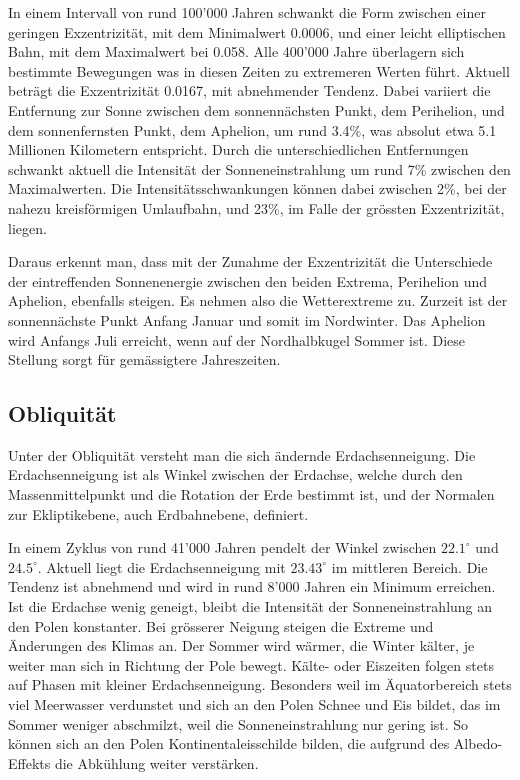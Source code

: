 In einem Intervall von rund 100'000 Jahren schwankt die Form zwischen einer geringen Exzentrizität, mit dem Minimalwert 0.0006, und einer leicht elliptischen Bahn, mit dem Maximalwert bei 0.058.
Alle 400'000 Jahre überlagern sich bestimmte Bewegungen was in diesen Zeiten zu extremeren Werten führt.
Aktuell beträgt die Exzentrizität 0.0167, mit abnehmender Tendenz.
Dabei variiert die Entfernung zur Sonne zwischen dem sonnennächsten Punkt, dem Perihelion, und dem son\-nen\-fern\-sten Punkt, dem Aphelion, um rund 3.4\%, was absolut etwa 5.1 Millionen Kilometern entspricht.
Durch die unterschiedlichen Entfernungen schwankt aktuell die Intensität der Sonneneinstrahlung um rund 7\% zwischen den Maximalwerten.
Die Intensitätsschwankungen können dabei zwischen 2\%, bei der nahezu kreisförmigen Umlaufbahn, und 23\%, im Falle der grössten Exzentrizität, liegen.

Daraus erkennt man, dass mit der Zunahme der Exzentrizität die Unterschiede der eintreffenden Sonnenenergie zwischen den beiden Extrema, Perihelion und Aphelion, ebenfalls steigen.
Es nehmen also die Wetterextreme zu.
Zurzeit ist der sonnennächste Punkt Anfang Januar und somit im Nordwinter. Das Aphelion wird Anfangs Juli erreicht, wenn auf der Nordhalbkugel Sommer ist.
Diese Stellung sorgt für gemässigtere Jahreszeiten. 

\subsection{Obliquität
\label{milankovic:subsection:Obliquität}}
Unter der Obliquität versteht man die sich ändernde Erdachsenneigung.
Die Erdachsenneigung ist als Winkel zwischen der Erdachse, welche durch den Massenmittelpunkt und die Rotation der Erde bestimmt ist, und der Normalen zur Ekliptikebene, auch Erdbahnebene, definiert.

In einem Zyklus von rund 41'000 Jahren pendelt der Winkel zwischen $22.1^\circ$ und $24.5^\circ$.
Aktuell liegt die Erdachsenneigung mit $23.43^\circ$ im mittleren Bereich.
Die Tendenz ist abnehmend und wird in rund 8’000 Jahren ein Minimum erreichen.
Ist die Erdachse wenig geneigt, bleibt die Intensität der Sonneneinstrahlung an den Polen konstanter.
Bei grösserer Neigung steigen die Extreme und Änderungen des Klimas an.
Der Sommer wird wärmer, die Winter kälter, je weiter man sich in Richtung der Pole bewegt.
Kälte- oder Eiszeiten folgen stets auf Phasen mit kleiner Erdachsenneigung.
Besonders weil im Äquatorbereich stets viel Meerwasser verdunstet und sich an den Polen Schnee und Eis bildet, das im Sommer weniger abschmilzt, weil die Sonneneinstrahlung nur gering ist.
So können sich an den Polen Kontinentaleisschilde bilden, die aufgrund des Albedo-Effekts die Abkühlung weiter verstärken.

